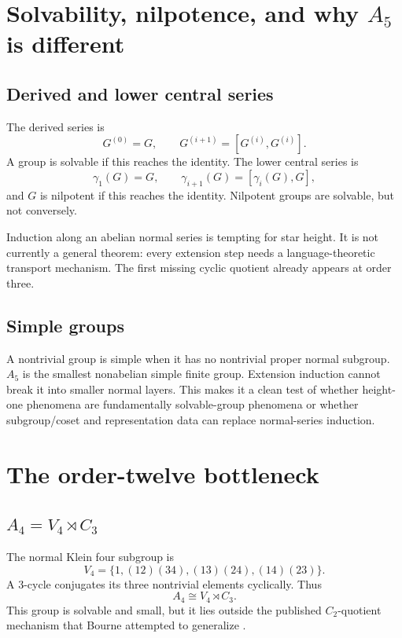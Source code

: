 \documentclass{amsart}
\begin{document}
\section{Solvability, nilpotence, and why $A_5$ is different}

\subsection{Derived and lower central series}

The derived series is
\[
  G^{(0)}=G,\qquad G^{(i+1)}=[G^{(i)},G^{(i)}].
\]
A group is solvable if this reaches the identity.  The lower central series is
\[
  \gamma_1(G)=G,\qquad \gamma_{i+1}(G)=[\gamma_i(G),G],
\]
and $G$ is nilpotent if this reaches the identity.  Nilpotent groups are solvable, but not conversely.

Induction along an abelian normal series is tempting for star height.  It is not currently a general theorem: every extension step needs a language-theoretic transport mechanism.  The first missing cyclic quotient already appears at order three.

\subsection{Simple groups}

A nontrivial group is simple when it has no nontrivial proper normal subgroup.  $A_5$ is the smallest nonabelian simple finite group.  Extension induction cannot break it into smaller normal layers.  This makes it a clean test of whether height-one phenomena are fundamentally solvable-group phenomena or whether subgroup/coset and representation data can replace normal-series induction.

\section{The order-twelve bottleneck}

\subsection{$A_4=V_4\rtimes C_3$}

The normal Klein four subgroup is
\[
  V_4=\{1,(12)(34),(13)(24),(14)(23)\}.
\]
A $3$-cycle conjugates its three nontrivial elements cyclically.  Thus
\[
  A_4\cong V_4\rtimes C_3.
\]
This group is solvable and small, but it lies outside the published $C_2$-quotient mechanism that Bourne attempted to generalize \cite{bourne2017counting}.
\end{document}
